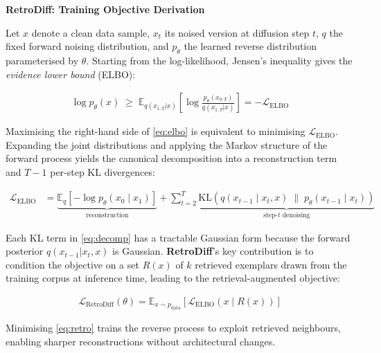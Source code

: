 \documentclass[11pt]{article}
\begin{document}
\begin{center}
  {\large\bfseries RetroDiff: Training Objective Derivation}
\end{center}

\medskip

\noindent
Let $x$ denote a clean data sample, $x_t$ its noised version at diffusion step $t$,
$q$ the fixed forward noising distribution, and $p_\theta$ the learned reverse distribution
parameterised by $\theta$.  Starting from the log-likelihood, Jensen's inequality gives the
\emph{evidence lower bound} (ELBO):

\begin{align}
  \log p_\theta(x) \;\geq\;
  \mathbb{E}_{q(x_{1:T}|x)}\!\left[\log\frac{p_\theta(x_{0:T})}{q(x_{1:T}|x)}\right]
  = -\mathcal{L}_{\mathrm{ELBO}}
  \label{eq:elbo}
\end{align}

\noindent
Maximising the right-hand side of \eqref{eq:elbo} is equivalent to minimising
$\mathcal{L}_{\mathrm{ELBO}}$.  Expanding the joint distributions and applying the Markov
structure of the forward process yields the canonical decomposition into a reconstruction
term and $T\!-\!1$ per-step KL divergences:

\begin{align}
  \mathcal{L}_{\mathrm{ELBO}}
  &= \underbrace{\mathbb{E}_{q}\!\left[-\log p_\theta(x_0\mid x_1)\right]}_{\text{reconstruction}}
   + \sum_{t=2}^{T}
     \underbrace{\mathrm{KL}\!\left(
       q(x_{t-1}\mid x_t,x)
       \;\|\;
       p_\theta(x_{t-1}\mid x_t)
     \right)}_{\text{step-}t\text{ denoising}}
  \label{eq:decomp}
\end{align}

\noindent
Each KL term in \eqref{eq:decomp} has a tractable Gaussian form because the forward
posterior $q(x_{t-1}|x_t,x)$ is Gaussian.  \textbf{RetroDiff}'s key contribution is to
condition the objective on a set $R(x)$ of $k$ retrieved exemplars drawn from the training
corpus at inference time, leading to the retrieval-augmented objective:

\begin{align}
  \mathcal{L}_{\mathrm{RetroDiff}}(\theta)
  = \mathbb{E}_{x\sim p_{\mathrm{data}}}\!\left[
      \mathcal{L}_{\mathrm{ELBO}}\!\left(x \;\big|\; R(x)\right)
    \right]
  \label{eq:retro}
\end{align}

\noindent
Minimising \eqref{eq:retro} trains the reverse process to exploit retrieved neighbours,
enabling sharper reconstructions without architectural changes.
\end{document}
